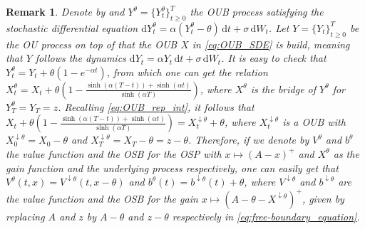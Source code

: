 \documentclass{tufte-handout}
\newcommand{\dif}{\mathrm{d}}
\newtheorem{rmk}{Remark}
\begin{document}
	\begin{rmk}\label{rmk:theta}
		Denote by and $Y^\theta = \{Y_t^{\theta}\}_{t\geq 0}^{T}$ the OUB process satisfying the stochastic differential equation $\dif Y_t^\theta = \alpha(Y_t^\theta - \theta)\,\dif t + \sigma\,\dif W_t$. Let $Y = \{Y_t\}_{t\geq0}^{T}$ be the OU process on top of that the OUB $X$ in \eqref{eq:OUB_SDE} is build, meaning that $Y$ follows the dynamics $\dif Y_t = \alpha Y_t\,\dif t + \sigma\,\dif W_t$. It is easy to check that $Y_t^{\theta} = Y_t + \theta(1 - e^{-\alpha t})$, from which one can get the relation $X_t^{\theta} = X_t + \theta\left(1 - \frac{\sinh(\alpha (T - t)) + \sinh(\alpha t)}{\sinh(\alpha T)}\right)$, where $X^\theta$ is the bridge of $Y^\theta$ for $Y_T^\theta = Y_T = z$. Recalling \eqref{eq:OUB_rep_int}, it follows that $X_t + \theta\left(1 - \frac{\sinh(\alpha (T - t)) + \sinh(\alpha t)}{\sinh(\alpha T)}\right) = X_t^{\downarrow\theta} + \theta$, where $X_t^{\downarrow\theta}$ is a OUB with $X_0^{\downarrow\theta} = X_0 - \theta$ and $X_T^{\downarrow\theta} = X_T - \theta = z - \theta$. Therefore, if we denote by $V^\theta$ and $b^{\theta}$ the value function and the OSB for the OSP with $x\mapsto (A - x)^+$ and $X^\theta$ as the gain function and the underlying process respectively, one can easily get that $V^\theta(t, x) = V^{\downarrow\theta}(t, x - \theta)$ and  $b^\theta(t) =  b^{\downarrow\theta}(t) + \theta$, where $V^{\downarrow\theta}$ and $b^{\downarrow\theta}$ are the value function and the OSB for the gain $x\mapsto (A - \theta - X^{\downarrow\theta})^+$, given by replacing $A$ and $z$ by $A - \theta$ and $z - \theta$ respectively in \eqref{eq:free-boundary_equation}.
	\end{rmk}
	
\end{document}
